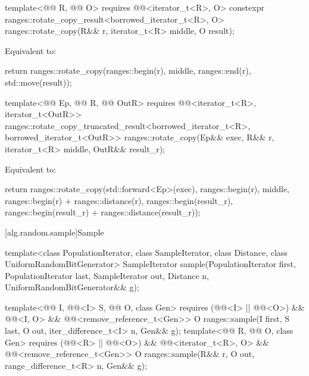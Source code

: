 \begin{itemdecl}
template<@@ R, @@ O>
  requires @@<iterator_t<R>, O>
  constexpr ranges::rotate_copy_result<borrowed_iterator_t<R>, O>
    ranges::rotate_copy(R&& r, iterator_t<R> middle, O result);
\end{itemdecl}

\begin{itemdescr}
\pnum
\effects
Equivalent to:
\begin{codeblock}
return ranges::rotate_copy(ranges::begin(r), middle, ranges::end(r), std::move(result));
\end{codeblock}
\end{itemdescr}

\begin{itemdecl}
template<@@ Ep, @@ R, @@ OutR>
  requires @@<iterator_t<R>, iterator_t<OutR>>
  ranges::rotate_copy_truncated_result<borrowed_iterator_t<R>, borrowed_iterator_t<OutR>>
    ranges::rotate_copy(Ep&& exec, R&& r, iterator_t<R> middle, OutR&& result_r);
\end{itemdecl}

\begin{itemdescr}
\pnum
\effects
Equivalent to:
\begin{codeblock}
return ranges::rotate_copy(std::forward<Ep>(exec), ranges::begin(r), middle,
                           ranges::begin(r) + ranges::distance(r),
                           ranges::begin(result_r),
                           ranges::begin(result_r) + ranges::distance(result_r));
\end{codeblock}
\end{itemdescr}

[alg.random.sample]{Sample}

%
\begin{itemdecl}
template<class PopulationIterator, class SampleIterator,
         class Distance, class UniformRandomBitGenerator>
  SampleIterator sample(PopulationIterator first, PopulationIterator last,
                        SampleIterator out, Distance n,
                        UniformRandomBitGenerator&& g);

template<@@ I, @@<I> S, @@ O, class Gen>
  requires (@@<I> || @@<O>) &&
           @@<I, O> &&
           @@<remove_reference_t<Gen>>
  O ranges::sample(I first, S last, O out, iter_difference_t<I> n, Gen&& g);
template<@@ R, @@ O, class Gen>
  requires (@@<R> || @@<O>) &&
           @@<iterator_t<R>, O> &&
           @@<remove_reference_t<Gen>>
  O ranges::sample(R&& r, O out, range_difference_t<R> n, Gen&& g);
\end{itemdecl}

